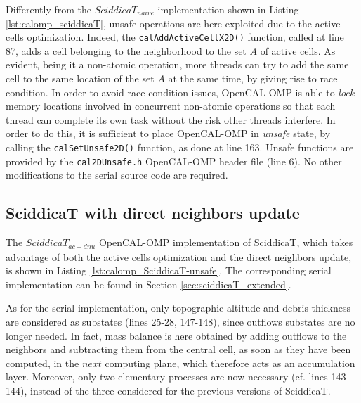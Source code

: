 

Differently from the $SciddicaT_{naive}$ implementation shown in
Listing \ref{lst:calomp_sciddicaT}, unsafe operations are here
exploited due to the active cells optimization. Indeed, the
\verb'calAddActiveCellX2D()' function, called at line 87, adds a cell
belonging to the neighborhood to the set $A$ of active cells. As
evident, being it a non-atomic operation, more threads can try to add
the same cell to the same location of the set $A$ at the same time, by
giving rise to race condition. In order to avoid race condition
issues, OpenCAL-OMP is able to \emph{lock} memory locations involved
in concurrent non-atomic operations so that each thread can complete
its own task without the risk other threads interfere. In order to do
this, it is sufficient to place OpenCAL-OMP in \emph{unsafe} state, by
calling the \verb'calSetUnsafe2D()' function, as done at line
163. Unsafe functions are provided by the \verb'cal2DUnsafe.h'
OpenCAL-OMP header file (line 6). No other modifications to the serial
source code are required.

\subsection{SciddicaT with direct neighbors update}
The $SciddicaT_{ac+dnu}$ OpenCAL-OMP implementation of SciddicaT,
which takes advantage of both the active cells optimization and the
direct neighbors update, is shown in Listing
\ref{lst:calomp_SciddicaT-unsafe}. The corresponding serial
implementation can be found in Section \ref{sec:sciddicaT_extended}.



As for the serial implementation, only topographic altitude and debris
thickness are considered as substates (lines 25-28, 147-148), since
outflows substates are no longer needed. In fact, mass balance is here
obtained by adding outflows to the neighbors and subtracting them from
the central cell, as soon as they have been computed, in the $next$
computing plane, which therefore acts as an accumulation
layer. Moreover, only two elementary processes are now necessary
(cf. lines 143-144), instead of the three considered for the previous
versions of SciddicaT.

